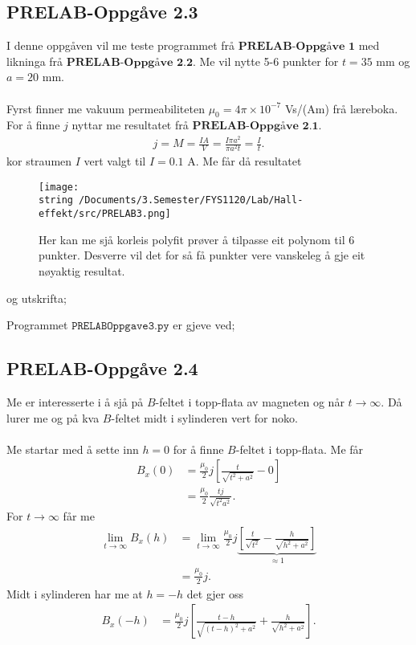 \documentclass[11pt, a4paper]{article}
\theoremstyle{definition}
\begin{document}
  \subsection*{PRELAB-Oppgåve 2.3}
    I denne oppgåven vil me teste programmet frå $\textbf{PRELAB-Oppgåve 1}$ med likninga frå $\textbf{PRELAB-Oppgåve 2.2}$.
    Me vil nytte 5-6 punkter for $t = 35$ mm og $a = 20$ mm. \\ \\
    Fyrst finner me vakuum permeabiliteten $\mu_0 = 4\pi \times 10^{-7}$ Vs/(Am) frå læreboka. For å finne $j$ nyttar me resultatet frå $\textbf{PRELAB-Oppgåve 2.1}$.
    \begin{align*}
      j = M = \frac{IA}{V} = \frac{I\pi a^2}{\pi a^2t} = \frac{I}{t}.
    \end{align*}
    kor straumen $I$ vert valgt til $I = 0.1$ A. Me får då resultatet
    \begin{figure}[H]
      \centering
      \texttt{[image: \\string~/Documents/3.Semester/FYS1120/Lab/Hall-effekt/src/PRELAB3.png]}
      \caption{Her kan me sjå korleis polyfit prøver å tilpasse eit polynom til 6 punkter. Desverre vil det for så få punkter vere vanskeleg å gje eit nøyaktig resultat.}
    \end{figure}
    og utskrifta;
    
    Programmet $\texttt{PRELABOppgave3.py}$ er gjeve ved;
    

  \subsection*{PRELAB-Oppgåve 2.4}
    Me er interesserte i å sjå på $B$-feltet i topp-flata av magneten og når $t \to \infty$. Då lurer me og på kva $B$-feltet midt i sylinderen vert for noko. \\ \\
    Me startar med å sette inn $h = 0$ for å finne $B$-feltet i topp-flata. Me får
    \begin{align*}
      B_x(0) &= \frac{\mu_0}{2}j\left[ \frac{t}{\sqrt{t^2 + a^2}} - 0 \right] \\
      &= \frac{\mu_0}{2}\frac{tj}{\sqrt{t^2 a^2}}.
    \end{align*}
    For $t \to \infty$ får me
    \begin{align*}
      \lim_{t \to \infty} B_x(h) &= \lim_{t \to \infty} \frac{\mu_0}{2}j\underbrace{\left[ \frac{t}{\sqrt{t^2}} - \frac{h}{\sqrt{h^2 + a^2}} \right]}_{\approx 1} \\
      &= \frac{\mu_0}{2}j.
    \end{align*}
    Midt i sylinderen har me at $h = -h$ det gjer oss
    \begin{align*}
      B_x(-h) &= \frac{\mu_0}{2}j\left[ \frac{t - h}{\sqrt{(t - h)^2 + a^2}} + \frac{h}{\sqrt{h^2 + a^2}} \right].
    \end{align*}
\end{document}
